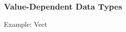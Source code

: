 \begin{frame}[fragile]
\frametitle{Value-Dependent Data Types}

\begin{block}{Example: Vect}

\end{block}

\end{frame}
